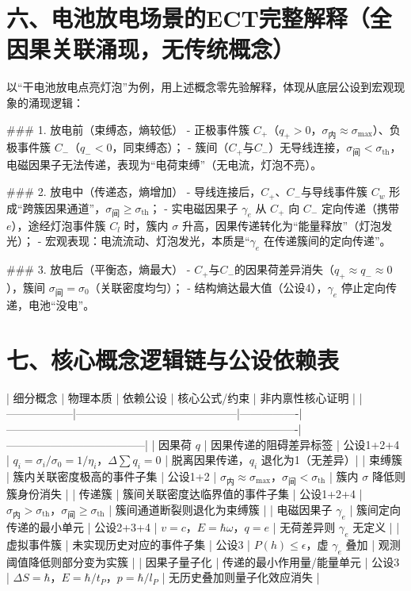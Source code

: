 \documentclass{article}
\begin{document}
\section*{六、电池放电场景的ECT完整解释（全因果关联涌现，无传统概念）}
以“干电池放电点亮灯泡”为例，用上述概念零先验解释，体现从底层公设到宏观现象的涌现逻辑：

### 1. 放电前（束缚态，熵较低）
- 正极事件簇 $C_+$（$q_+ > 0$，$\sigma_{\text{内}} \approx \sigma_{\text{max}}$）、负极事件簇 $C_-$（$q_- < 0$，同束缚态）；  
- 簇间（$C_+$与$C_-$）无导线连接，$\sigma_{\text{间}} < \sigma_{\text{th}}$，电磁因果子无法传递，表现为“电荷束缚”（无电流，灯泡不亮）。

### 2. 放电中（传递态，熵增加）
- 导线连接后，$C_+$、$C_-$与导线事件簇 $C_w$ 形成“跨簇因果通道”，$\sigma_{\text{间}} \geq \sigma_{\text{th}}$；  
- 实电磁因果子 $\gamma_e$ 从 $C_+$ 向 $C_-$ 定向传递（携带 $e$），途经灯泡事件簇 $C_l$ 时，簇内 $\sigma$ 升高，因果传递转化为“能量释放”（灯泡发光）；  
- 宏观表现：电流流动、灯泡发光，本质是“$\gamma_e$ 在传递簇间的定向传递”。

### 3. 放电后（平衡态，熵最大）
- $C_+$与$C_-$的因果荷差异消失（$q_+ \approx q_- \approx 0$），簇间 $\sigma_{\text{间}} = \sigma_0$（关联密度均匀）；  
- 结构熵达最大值（公设4），$\gamma_e$ 停止定向传递，电池“没电”。


\section*{七、核心概念逻辑链与公设依赖表}
| 细分概念         | 物理本质                                   | 依赖公设       | 核心公式/约束                                                                 | 非内禀性核心证明                     |
|------------------|--------------------------------------------|----------------|-------------------------------------------------------------------------------|--------------------------------------|
| 因果荷 $q$       | 因果传递的阻碍差异标签                     | 公设1+2+4      | $q_i = \sigma_i/\sigma_0 = 1/\eta_i$，$\Delta \sum q_i = 0$                    | 脱离因果传递，$q_i$ 退化为1（无差异）|
| 束缚簇           | 簇内关联密度极高的事件子集                 | 公设1+2        | $\sigma_{\text{内}} \approx \sigma_{\text{max}}$，$\sigma_{\text{间}} < \sigma_{\text{th}}$ | 簇内 $\sigma$ 降低则簇身份消失       |
| 传递簇           | 簇间关联密度达临界值的事件子集             | 公设1+2+4      | $\sigma_{\text{内}} > \sigma_{\text{th}}$，$\sigma_{\text{间}} \geq \sigma_{\text{th}}$    | 簇间通道断裂则退化为束缚簇           |
| 电磁因果子 $\gamma_e$ | 簇间定向传递的最小单元                     | 公设2+3+4      | $v=c$，$E=\hbar\omega$，$q=e$                                                 | 无荷差异则 $\gamma_e$ 无定义         |
| 虚拟事件簇       | 未实现历史对应的事件子集                   | 公设3          | $P(h) \leq \epsilon$，虚 $\gamma_e$ 叠加                                      | 观测阈值降低则部分变为实簇           |
| 因果子量子化     | 传递的最小作用量/能量单元                   | 公设3          | $\Delta S=\hbar$，$E=\hbar/t_P$，$p=\hbar/l_P$                                | 无历史叠加则量子化效应消失           |
\end{document}
